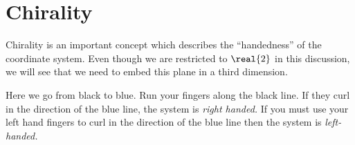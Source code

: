 \section{Chirality}
Chirality is an important concept which describes the ``handedness'' of the coordinate system. Even though we are restricted to $\real{2}$ in this discussion, we will see that we need to embed this plane in a third dimension.

Here we go from black to blue. Run your fingers along the black line. If they curl in the direction of the blue line, the system is \emph{right handed.} If you must use your left hand fingers to curl in the direction of the blue line then the system is \emph{left-handed.}

\endinput